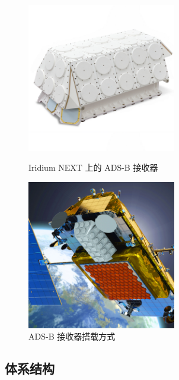 \begin{itemize}
    \begin{figure}[!htb]
    \centering
    \begin{minipage}[t]{0.48\textwidth}
    \centering
    \includegraphics[width=6.5cm]{pic/Appstar_with_Base_2000x2000.jpg}
    \caption{Iridium NEXT 上的 ADS-B 接收器\protect\footnotemark}
    \label{fig:Appstar_with_Base}
    \end{minipage}
    \begin{minipage}[t]{0.48\textwidth}
    \centering
    \includegraphics[width=6.5cm]{pic/reconfigurable_multimission_payloads_v2_web.jpg}
    \caption{ADS-B 接收器搭载方式\protect\footnotemark}
    \label{fig:reconfigurable_multimission_payloads}
    \end{minipage}
    \end{figure}

\end{itemize}

\subsection{体系结构}

